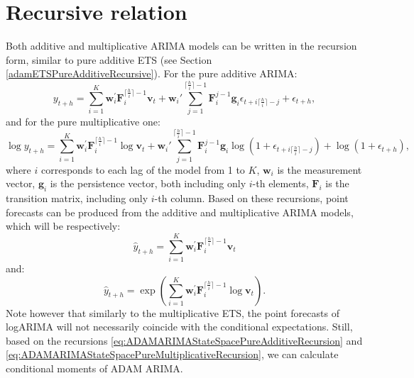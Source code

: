 \documentclass[
]{book}
\theoremstyle{definition}
\theoremstyle{definition}
\theoremstyle{definition}
\theoremstyle{definition}
\theoremstyle{remark}
\begin{document}
\hypertarget{ADAMARIMARecursive}{%
\section{Recursive relation}\label{ADAMARIMARecursive}}

Both additive and multiplicative ARIMA models can be written in the recursion form, similar to pure additive ETS (see Section \ref{adamETSPureAdditiveRecursive}). For the pure additive ARIMA:
\begin{equation}
    y_{t+h} = \sum_{i=1}^K \mathbf{w}_{i}^\prime \mathbf{F}_{i}^{\lceil\frac{h}{i}\rceil-1} \mathbf{v}_{t} + \mathbf{w}_{i}' \sum_{j=1}^{\lceil\frac{h}{i}\rceil-1} \mathbf{F}_{i}^{j-1} \mathbf{g}_{i} \epsilon_{t+i\lceil\frac{h}{i}\rceil-j} + \epsilon_{t+h} ,
  \label{eq:ADAMARIMAStateSpacePureAdditiveRecursion}
\end{equation}
and for the pure multiplicative one:
\begin{equation}
    \log y_{t+h} = \sum_{i=1}^K \mathbf{w}_{i}^\prime \mathbf{F}_{i}^{\lceil\frac{h}{i}\rceil-1} \log \mathbf{v}_{t} + \mathbf{w}_{i}' \sum_{j=1}^{\lceil\frac{h}{i}\rceil-1} \mathbf{F}_{i}^{j-1} \mathbf{g}_{i} \log (1+\epsilon_{t+i\lceil\frac{h}{i}\rceil-j}) + \log(1+ \epsilon_{t+h}) ,
  \label{eq:ADAMARIMAStateSpacePureMultiplicativeRecursion}
\end{equation}
where \(i\) corresponds to each lag of the model from 1 to \(K\), \(\mathbf{w}_{i}\) is the measurement vector, \(\mathbf{g}_{i}\) is the persistence vector, both including only \(i\)-th elements, \(\mathbf{F}_{i}\) is the transition matrix, including only \(i\)-th column. Based on these recursions, point forecasts can be produced from the additive and multiplicative ARIMA models, which will be respectively:
\begin{equation}
    \hat{y}_{t+h} = \sum_{i=1}^K \mathbf{w}_{i}^\prime \mathbf{F}_{i}^{\lceil\frac{h}{i}\rceil-1} \mathbf{v}_{t}
  \label{eq:ADAMARIMAStateSpacePureAdditiveForecast}
\end{equation}
and:
\begin{equation}
    \hat{y}_{t+h} = \exp\left(\sum_{i=1}^K \mathbf{w}_{i}^\prime \mathbf{F}_{i}^{\lceil\frac{h}{i}\rceil-1} \log \mathbf{v}_{t} \right) .
  \label{eq:ADAMARIMAStateSpacePureMultiplicativeForecast}
\end{equation}
Note however that similarly to the multiplicative ETS, the point forecasts of logARIMA will not necessarily coincide with the conditional expectations. Still, based on the recursions \eqref{eq:ADAMARIMAStateSpacePureAdditiveRecursion} and \eqref{eq:ADAMARIMAStateSpacePureMultiplicativeRecursion}, we can calculate conditional moments of ADAM ARIMA.
\end{document}
